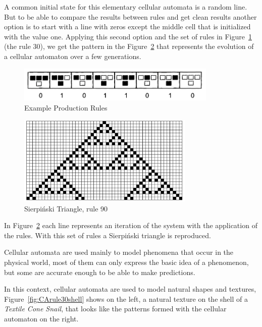 A common initial state for this elementary cellular automata is a random line. But to be able to compare the results between rules and get clean results another option is to start with a line with zeros except the middle cell that is initialized with the value one. Applying this second option and the set of rules in Figure~\ref{fig:CArule} (the rule 30), we get the pattern in the Figure~\ref{fig:resultCA} that represents the evolution of a cellular automaton over a few generations.

\begin{figure}[htbp]
	\centering
	\includegraphics[width=0.85\textwidth]{img/Theory/Cellular_A/Rules.png}
	\caption{Example Production Rules\cite{Shiffman2012}}
	\label{fig:CArule}
\end{figure}



\begin{figure}[H]
    \centering
    \includegraphics[width=0.75\textwidth]{img/Theory/Cellular_A/Result.png}
    \caption{Sierpiński Triangle, rule 90}
    \label{fig:resultCA}
\end{figure}


In Figure~\ref{fig:resultCA} each line represents an iteration of the system with the application of the rules. With this set of rules a Sierpiński triangle is reproduced.


Cellular automata are used mainly to model phenomena that occur in the physical world, most of them can only express the basic idea of a phenomenon, but some are accurate enough to be able to make predictions.

In this context, cellular automata are used to model natural shapes and textures, Figure~\ref{fig:CArule30shell} shows on the left, a natural texture on the shell of a \emph{Textile Cone Snail}, that looks like the patterns formed with the cellular automaton on the right.



